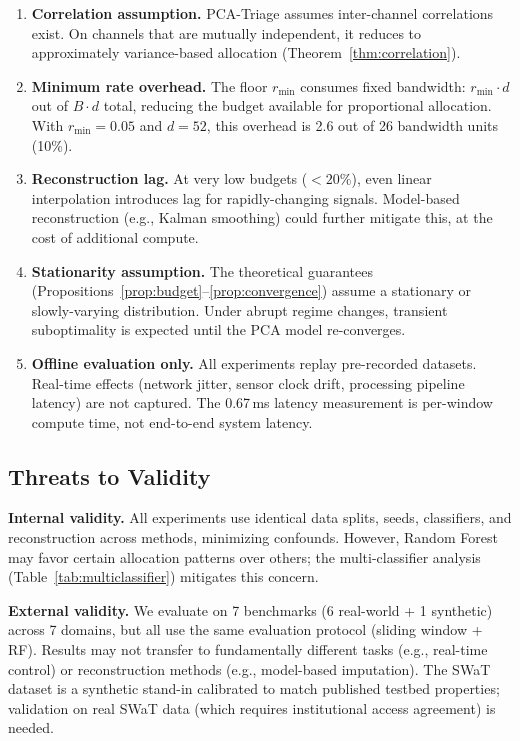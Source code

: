 \documentclass[journal]{IEEEtran}
\begin{document}
\begin{enumerate}[leftmargin=*]
\item \textbf{Correlation assumption.} PCA-Triage assumes inter-channel correlations exist. On channels that are mutually independent, it reduces to approximately variance-based allocation (Theorem~\ref{thm:correlation}).
\item \textbf{Minimum rate overhead.} The floor $r_{\min}$ consumes fixed bandwidth: $r_{\min} \cdot d$ out of $B \cdot d$ total, reducing the budget available for proportional allocation. With $r_{\min} = 0.05$ and $d = 52$, this overhead is 2.6 out of 26 bandwidth units (10\%).
\item \textbf{Reconstruction lag.} At very low budgets ($< 20\%$), even linear interpolation introduces lag for rapidly-changing signals. Model-based reconstruction (e.g., Kalman smoothing) could further mitigate this, at the cost of additional compute.
\item \textbf{Stationarity assumption.} The theoretical guarantees (Propositions~\ref{prop:budget}--\ref{prop:convergence}) assume a stationary or slowly-varying distribution. Under abrupt regime changes, transient suboptimality is expected until the PCA model re-converges.
\item \textbf{Offline evaluation only.} All experiments replay pre-recorded datasets. Real-time effects (network jitter, sensor clock drift, processing pipeline latency) are not captured. The 0.67\,ms latency measurement is per-window compute time, not end-to-end system latency.
\end{enumerate}

\subsection{Threats to Validity}

\textbf{Internal validity.} All experiments use identical data splits, seeds, classifiers, and reconstruction across methods, minimizing confounds. However, Random Forest may favor certain allocation patterns over others; the multi-classifier analysis (Table~\ref{tab:multiclassifier}) mitigates this concern.

\textbf{External validity.} We evaluate on 7 benchmarks (6 real-world + 1 synthetic) across 7 domains, but all use the same evaluation protocol (sliding window + RF). Results may not transfer to fundamentally different tasks (e.g., real-time control) or reconstruction methods (e.g., model-based imputation). The SWaT dataset is a synthetic stand-in calibrated to match published testbed properties; validation on real SWaT data (which requires institutional access agreement) is needed.
\end{document}
